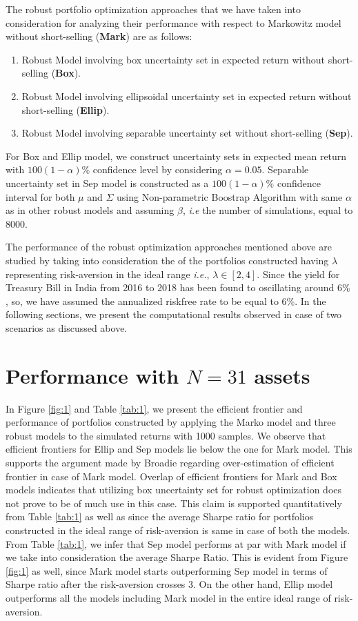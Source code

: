The robust portfolio optimization approaches that we have taken into consideration for analyzing their performance with respect to Markowitz model without short-selling (\textbf{Mark}) are as follows:
\begin{enumerate}
    \item{Robust Model involving box uncertainty set in expected return without short-selling (\textbf{Box}).}
    \item{Robust Model involving ellipsoidal uncertainty set in expected return without short-selling (\textbf{Ellip}).}
    \item{Robust Model involving separable uncertainty set without short-selling (\textbf{Sep}).}
\end{enumerate}
For Box and Ellip model, we construct uncertainty sets in expected mean return with $100(1-\alpha)\%$ confidence level by considering $\alpha=0.05$. Separable uncertainty set in Sep model is constructed as a $100(1-\alpha)\%$ confidence interval for both $\mu$ and $\Sigma$ using Non-parametric Boostrap Algorithm with same $\alpha$ as in other robust models and assuming $\beta$, \textit{i.e} the number of simulations, equal to 8000.

The performance of the robust optimization approaches mentioned above are studied by taking into consideration the  of the portfolios constructed having $\lambda$ representing risk-aversion in the ideal range \cite{fabozzi} \textit{i.e.}, $\lambda \in [2,4]$. Since the yield for Treasury Bill in India from 2016 to 2018 has been found to oscillating around $6\%$ \cite{rbi}, so, we have assumed the annualized riskfree rate to be equal to $6\%$. In the following sections, we present the computational results observed in case of two scenarios as discussed above.

\section{Performance with $N=31$ assets}

In Figure \ref{fig:1} and Table \ref{tab:1}, we present the efficient frontier and performance of portfolios constructed by applying the Marko model and three robust models to the simulated returns with 1000 samples. We observe that efficient frontiers for Ellip and Sep models lie below the one for Mark model. This supports the argument made by Broadie \cite{Broadie} regarding over-estimation of efficient frontier in case of Mark model. Overlap of efficient frontiers for Mark and Box models indicates that utilizing box uncertainty set for robust optimization does not prove to be of much use in this case. This claim is supported quantitatively from Table \ref{tab:1} as well as since the average Sharpe ratio for portfolios constructed in the ideal range of risk-aversion is same in case of both the models. From Table \ref{tab:1}, we infer that Sep model performs at par with Mark model if we take into consideration the average Sharpe Ratio. This is evident from Figure \ref{fig:1} as well, since Mark model starts outperforming Sep model in terms of Sharpe ratio after the risk-aversion crosses 3. On the other hand, Ellip model outperforms all the models including Mark model in the entire ideal range of risk-aversion.


